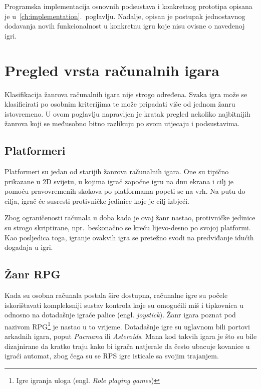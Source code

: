 \documentclass[times, utf8, zavrsni, numeric]{fer}
\begin{document}
\par Programska implementacija osnovnih podsustava i konkretnog prototipa opisana je u~\ref{ch:implementation}.~poglavlju.
Nadalje, opisan je postupak jednostavnog dodavanja novih funkcionalnost u konkretnu igru koje nisu ovisne o navedenoj igri.

\chapter{Pregled vrsta računalnih igara}\label{ch:games}

\par Klasifikacija žanrova računalnih igara nije strogo određena.
Svaka igra može se klasificirati po osobnim kriterijima te može pripadati više od jednom žanru istovremeno.
U ovom poglavlju napravljen je kratak pregled nekoliko najbitnijih žanrova koji se međusobno bitno razlikuju po svom utjecaju i podsustavima.

\section{Platformeri}

\par Platformeri su jedan od starijih žanrova računalnih igara.
One su tipično prikazane u 2D svijetu, u kojima igrač započne igru na dnu ekrana i cilj je pomoću pravovremenih skokova po platformama popeti se na vrh.
Na putu do cilja, igrač će susresti protivničke jedinice koje je cilj izbjeći.

\par Zbog ograničenosti računala u doba kada je ovaj žanr nastao, protivničke jedinice su strogo skriptirane, npr.\ beskonačno se kreću lijevo-desno po svojoj platformi.
Kao posljedica toga, igranje ovakvih igra se pretežno svodi na predviđanje idućih događaja u igri.

\section{Žanr RPG}

\par Kada su osobna računala postala šire dostupna, računalne igre su počele iskorištavati kompleksniji sustav kontrola koje su omogućili miš i tipkovnica u odnosno na dotadašnje igraće palice (engl. \textit{joystick}).
Žanr igara poznat pod nazivom RPG\footnote{Igre igranja uloga (engl. \textit{Role playing games})} je nastao u to vrijeme.
Dotadašnje igre su uglavnom bili portovi arkadnih igara, poput \textit{Pacmana} ili \textit{Asteroids}.
Mana kod takvih igara je što su bile dizajnirane da kratko traju kako bi igrača natjerale da često ubacuje kovanice u igraći automat, zbog čega su se RPS igre isticale sa svojim trajanjem.
\end{document}
